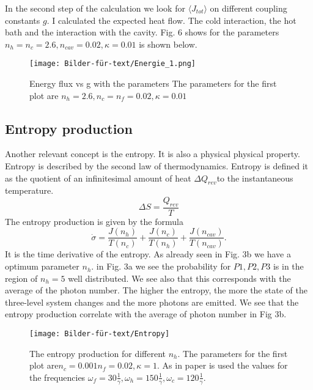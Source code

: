 \documentclass[12pt,a4paper]{article}
\begin{document}
In the second step of the calculation we look for $ \langle J_{tot}\rangle$ on different coupling constants $g$.
 I calculated the expected heat flow. The cold interaction, the hot bath and the interaction with the cavity.
Fig. 6 shows  for the parameters $n_h=n_c=2.6,  n_{cav}=0.02,\kappa=0.01 $ is shown below.

\begin{figure}[hbtp]
\centering
\texttt{[image: Bilder-für-text/Energie\_1.png]}
\caption{Energy flux vs g with the parameters The parameters for the first plot are $ n_h=2.6,n_c= n_f=0.02,\kappa=0.01 $}
\end{figure}


\subsection{Entropy production}
Another relevant concept is the entropy. It is also a physical physical property.
Entropy is described by the second law of thermodynamics.  
Entropy is defined it as the quotient of an infinitesimal amount of heat $\Delta Q_{rev}$to the instantaneous temperature.
\begin{equation}
\Delta S = \frac{Q_{rev}}{T}
\end{equation}
The entropy production is given by the formula
\begin{equation}
 \dot{\sigma} =\frac{J(n_h)}{T(n_c)}+\frac{J(n_c)}{T(n_h)}+\frac{J(n_{cav})}{T(n_{cav})}.\label{666}
 \end{equation}
 It is the time derivative of the entropy.
As already seen in Fig. 3b we have a optimum parameter $n_h$.  in Fig. 3a we see the probability for $P1,P2,P3$ is in the region of $n_h=5 $ well distributed. We see also that  this corresponds with the average of the photon number.
The higher the entropy, the more the state of the three-level system changes and the more photons are emitted.
We see that the entropy production correlate with the average of photon number in Fig 3b.
\begin{figure}[hbtp]
\centering
\texttt{[image: Bilder-für-text/Entropy]}
\caption{The entropy production for different $n_h$. The parameters for the first plot are$n_c=0.001 n_f=0.02,\kappa=1$. As in paper \cite{Li2017} is used the values for the frequencies $\omega_f=30\frac{1}{\gamma},\omega_h=150\frac{1}{\gamma}, \omega_c=120\frac{1}{\gamma}$.}
\end{figure}
\end{document}
